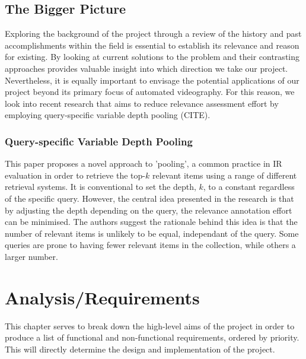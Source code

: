 \documentclass{l4proj}
\begin{document}
\section{The Bigger Picture}
Exploring the background of the project through a review of the history and past accomplishments within the field is essential to establish its relevance and reason for existing. By looking at current solutions to the problem and their contrasting approaches provides valuable insight into which direction we take our project. Nevertheless, it is equally important to envisage the potential applications of our project beyond its primary focus of automated videography. For this reason, we look into recent research that aims to reduce relevance assessment effort by employing query-specific variable depth pooling (CITE).

\subsection{Query-specific Variable Depth Pooling}
This paper proposes a novel approach to 'pooling', a common practice in IR evaluation in order to retrieve the top-$k$ relevant items using a range of different retrieval systems. It is conventional to set the depth, $k$, to a constant regardless of the specific query. However, the central idea presented in the research is that by adjusting the depth depending on the query, the relevance annotation effort can be minimised. The authors suggest the rationale behind this idea is that the number of relevant items is unlikely to be equal, independant of the query. Some queries are prone to having fewer relevant items in the collection, while others a larger number.







\chapter{Analysis/Requirements}
This chapter serves to break down the high-level aims of the project in order to produce a list of functional and non-functional requirements, ordered by priority. This will directly determine the design and implementation of the project.
\end{document}

